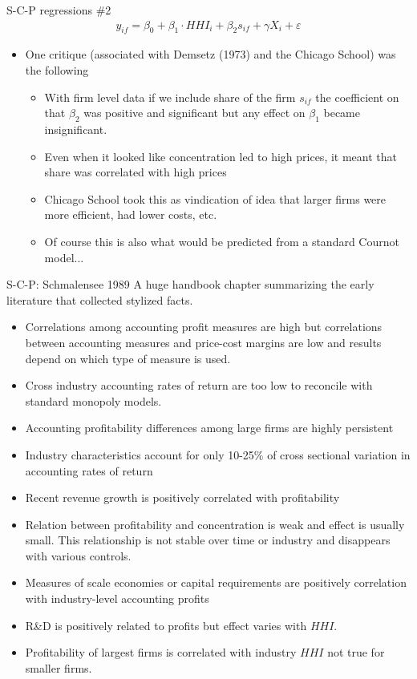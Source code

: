 \begin{frame}{S-C-P regressions \#2}
\begin{eqnarray*}
y_{if} = \beta_0 + \beta_1 \cdot HHI_i + \beta_2 s_{if} +  \gamma X_{i} +  \varepsilon
\end{eqnarray*}
\begin{itemize}
\item One critique (associated with Demsetz (1973) and the Chicago School) was the following
\begin{itemize}
\item With firm level data if we include share of the firm $s_{if}$ the coefficient on that $\beta_2$ was positive and significant but any effect on $\beta_1$ became insignificant.
\item Even when it looked like concentration led to high prices, it meant that share was correlated with high prices
\item Chicago School took this as vindication of idea that larger firms were more efficient, had lower costs, etc.
\item Of course this is also what would be predicted from a standard Cournot model...
\end{itemize}
\end{itemize}
\end{frame}


\begin{frame}{S-C-P: Schmalensee 1989}
A huge handbook chapter summarizing the early literature that collected stylized facts.
\footnotesize
\begin{itemize}
\item Correlations among accounting profit measures are high but correlations between accounting measures and price-cost margins are low and results depend on which type of measure is used.
\item Cross industry accounting rates of return are too low to reconcile with standard monopoly models.
\item Accounting profitability differences among large firms are highly persistent
\item Industry characteristics account for only 10-25\% of cross sectional variation in accounting rates of return
\item Recent revenue growth is positively correlated with profitability
\item Relation between profitability and concentration is weak and effect is usually small. This relationship is not stable over time or industry and disappears with various controls.
\item Measures of scale economies or capital requirements are positively correlation with industry-level accounting profits
\item R\&D is positively related to profits but effect varies with $HHI$.
\item Profitability of largest firms is correlated with industry $HHI$ not true for smaller firms.
\end{itemize}
\end{frame}

